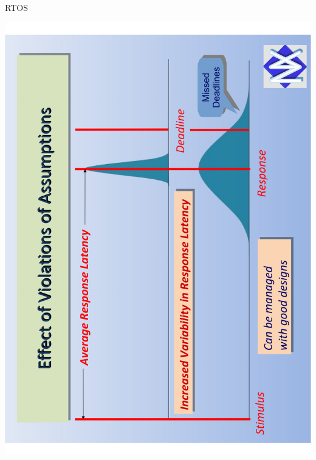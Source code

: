 \documentclass[aspectratio=169]{beamer}
\begin{document}
\begin{frame}{RTOS}
\begin{minipage}{0.5\textwidth}
\begin{overprint}
	\centering\includegraphics[angle=-90,origin=c,width=0.95\linewidth]{distribuição.pdf}

\end{overprint}
\end{minipage}
\end{frame}
\end{document}
